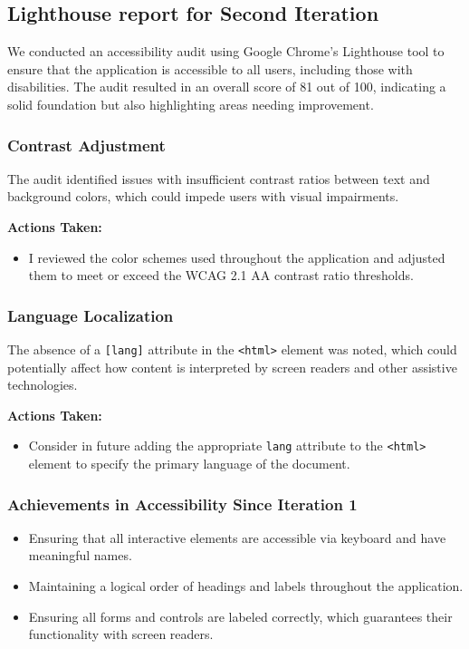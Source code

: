 \documentclass[12pt,a4paper]{article}
\begin{document}
\subsection{Lighthouse report for Second Iteration}
We conducted an accessibility audit using Google Chrome's Lighthouse tool to ensure that the application is accessible to all users, including those with disabilities. The audit resulted in an overall score of 81 out of 100, indicating a solid foundation but also highlighting areas needing improvement.

\subsubsection{Contrast Adjustment}
The audit identified issues with insufficient contrast ratios between text and background colors, which could impede users with visual impairments. 

\textbf{Actions Taken:}
\begin{itemize}
    \item I reviewed the color schemes used throughout the application and adjusted them to meet or exceed the WCAG 2.1 AA contrast ratio thresholds.
\end{itemize}

\subsubsection{Language Localization}
The absence of a \texttt{[lang]} attribute in the \texttt{<html>} element was noted, which could potentially affect how content is interpreted by screen readers and other assistive technologies.

\textbf{Actions Taken:}
\begin{itemize}
    \item Consider in future adding the appropriate \texttt{lang} attribute to the \texttt{<html>} element to specify the primary language of the document.
\end{itemize}


\subsubsection{Achievements in Accessibility Since Iteration 1}

\begin{itemize}
    \item Ensuring that all interactive elements are accessible via keyboard and have meaningful names.
    \item Maintaining a logical order of headings and labels throughout the application.
    \item Ensuring all forms and controls are labeled correctly, which guarantees their functionality with screen readers.
\end{itemize}
\end{document}
